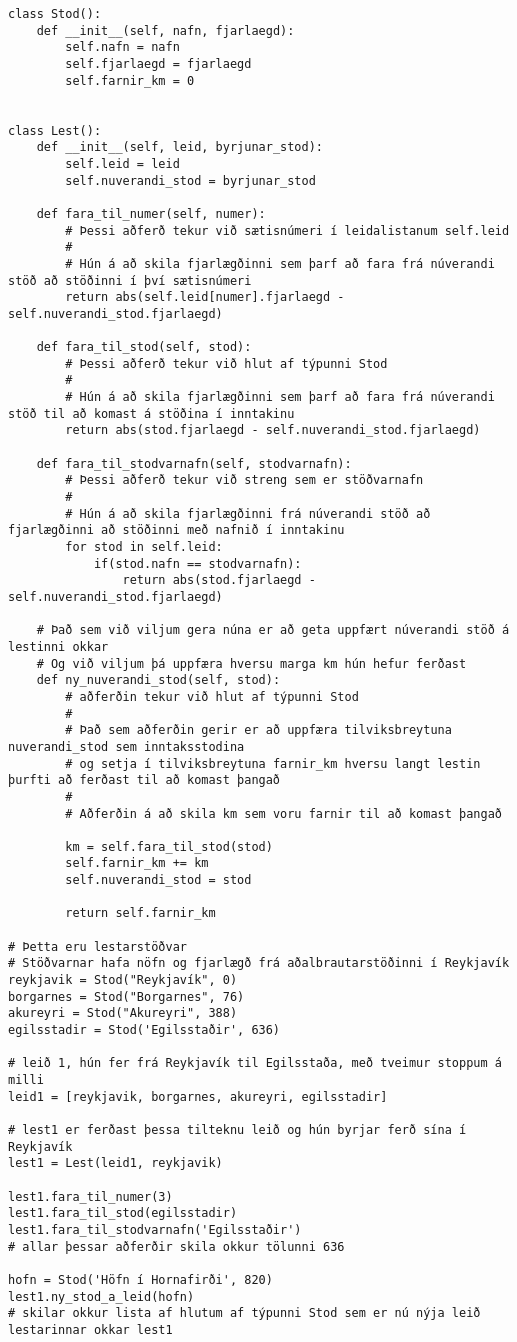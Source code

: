 \begin{lstlisting}[caption=Aðferðir kynntar með lestarkerfi, label=lst:klasar-aðferðir-lestar]
class Stod():
	def __init__(self, nafn, fjarlaegd):
		self.nafn = nafn
		self.fjarlaegd = fjarlaegd
		self.farnir_km = 0
	
	
class Lest():
	def __init__(self, leid, byrjunar_stod):
		self.leid = leid
		self.nuverandi_stod = byrjunar_stod
	
	def fara_til_numer(self, numer):
		# Þessi aðferð tekur við sætisnúmeri í leidalistanum self.leid
		#
		# Hún á að skila fjarlægðinni sem þarf að fara frá núverandi stöð að stöðinni í því sætisnúmeri
		return abs(self.leid[numer].fjarlaegd - self.nuverandi_stod.fjarlaegd)
	
	def fara_til_stod(self, stod):
		# Þessi aðferð tekur við hlut af týpunni Stod
		#
		# Hún á að skila fjarlægðinni sem þarf að fara frá núverandi stöð til að komast á stöðina í inntakinu
		return abs(stod.fjarlaegd - self.nuverandi_stod.fjarlaegd)
	
	def fara_til_stodvarnafn(self, stodvarnafn):
		# Þessi aðferð tekur við streng sem er stöðvarnafn
		#
		# Hún á að skila fjarlægðinni frá núverandi stöð að fjarlægðinni að stöðinni með nafnið í inntakinu
		for stod in self.leid:
			if(stod.nafn == stodvarnafn):
				return abs(stod.fjarlaegd - self.nuverandi_stod.fjarlaegd)
	
    # Það sem við viljum gera núna er að geta uppfært núverandi stöð á lestinni okkar
	# Og við viljum þá uppfæra hversu marga km hún hefur ferðast
	def ny_nuverandi_stod(self, stod):
		# aðferðin tekur við hlut af týpunni Stod
		#
		# Það sem aðferðin gerir er að uppfæra tilviksbreytuna nuverandi_stod sem inntaksstodina
		# og setja í tilviksbreytuna farnir_km hversu langt lestin þurfti að ferðast til að komast þangað
		#
		# Aðferðin á að skila km sem voru farnir til að komast þangað
		
		km = self.fara_til_stod(stod)
		self.farnir_km += km
		self.nuverandi_stod = stod
		
		return self.farnir_km
		
# Þetta eru lestarstöðvar
# Stöðvarnar hafa nöfn og fjarlægð frá aðalbrautarstöðinni í Reykjavík
reykjavik = Stod("Reykjavík", 0)
borgarnes = Stod("Borgarnes", 76)
akureyri = Stod("Akureyri", 388)
egilsstadir = Stod('Egilsstaðir', 636)

# leið 1, hún fer frá Reykjavík til Egilsstaða, með tveimur stoppum á milli
leid1 = [reykjavik, borgarnes, akureyri, egilsstadir]

# lest1 er ferðast þessa tilteknu leið og hún byrjar ferð sína í Reykjavík
lest1 = Lest(leid1, reykjavik)

lest1.fara_til_numer(3)
lest1.fara_til_stod(egilsstadir)
lest1.fara_til_stodvarnafn('Egilsstaðir')
# allar þessar aðferðir skila okkur tölunni 636

hofn = Stod('Höfn í Hornafirði', 820)
lest1.ny_stod_a_leid(hofn)
# skilar okkur lista af hlutum af týpunni Stod sem er nú nýja leið lestarinnar okkar lest1
\end{lstlisting}

